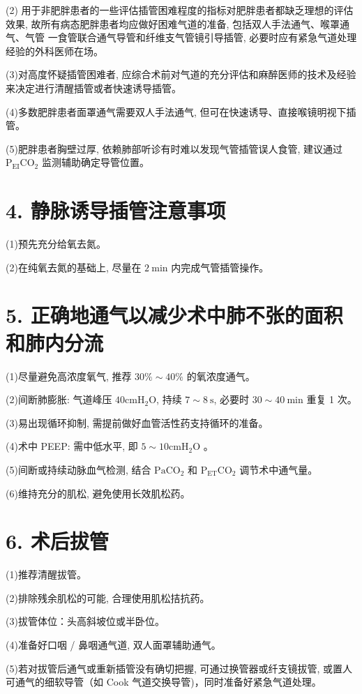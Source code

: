 \documentclass[10pt]{article}
\begin{document}
(2) 用于非肥胖患者的一些评估插管困难程度的指标对肥胖患者都缺乏理想的评估效果, 故所有病态肥胖患者均应做好困难气道的准备, 包括双人手法通气、喉罩通气、气管 一食管联合通气导管和纤维支气管镜引导插管, 必要时应有紧急气道处理经验的外科医师在场。

(3)对高度怀疑插管困难者, 应综合术前对气道的充分评估和麻醉医师的技术及经验来决定进行清醒插管或者快速诱导插管。

(4)多数肥胖患者面罩通气需要双人手法通气, 但可在快速诱导、直接喉镜明视下插管。

(5)肥胖患者胸壁过厚, 依赖肺部听诊有时难以发现气管插管误人食管, 建议通过 $\mathrm{P}_{\mathrm{EI}} \mathrm{CO}_{2}$ 监测辅助确定导管位置。

\section*{4. 静脉诱导插管注意事项}
(1)预先充分给氧去氮。

(2)在纯氧去氮的基础上, 尽量在 $2 \mathrm{~min}$ 内完成气管插管操作。

\section*{5. 正确地通气以减少术中肺不张的面积和肺内分流}
(1)尽量避免高浓度氧气, 推荐 $30 \% \sim 40 \%$ 的氧浓度通气。

(2)间断肺膨胀: 气道峰压 $40 \mathrm{cmH}_{2} \mathrm{O}$, 持续 $7 \sim 8 \mathrm{~s}$, 必要时 $30 \sim 40 \mathrm{~min}$ 重复 1 次。

(3)易出现循环抑制, 需提前做好血管活性药支持循环的准备。

(4)术中 PEEP: 需中低水平, 即 $5 \sim 10 \mathrm{cmH}_{2} \mathrm{O}$ 。

(5)间断或持续动脉血气检测, 结合 $\mathrm{PaCO}_{2}$ 和 $\mathrm{P}_{\mathrm{ET}} \mathrm{CO}_{2}$ 调节术中通气量。

(6)维持充分的肌松, 避免使用长效肌松药。

\section*{6. 术后拔管}
(1)推荐清醒拔管。

(2)排除残余肌松的可能, 合理使用肌松拮抗药。

(3)拔管体位：头高斜坡位或半卧位。

(4)准备好口咽 / 鼻咽通气道, 双人面罩辅助通气。

(5)若对拔管后通气或重新插管没有确切把握, 可通过换管器或纤支镜拔管, 或置人可通气的细软导管（如 Cook 气道交换导管)，同时准备好紧急气道处理。
\end{document}

